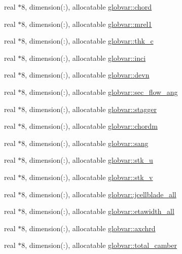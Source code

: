 \begin{DoxyCompactItemize}
real $\ast$8, dimension(\+:), allocatable \hyperlink{namespaceglobvar_a7b5f7850dbc4bf45b1c0477fe23101fd}{globvar\+::chord}
\item 
real $\ast$8, dimension(\+:), allocatable \hyperlink{namespaceglobvar_a0678586794cf430f0626766f74f99789}{globvar\+::mrel1}
\item 
real $\ast$8, dimension(\+:), allocatable \hyperlink{namespaceglobvar_a82469b82bd578f446472dd30088714f0}{globvar\+::thk\+\_\+c}
\item 
real $\ast$8, dimension(\+:), allocatable \hyperlink{namespaceglobvar_aa012253fe6b7a8b294e3e65bad3c31e8}{globvar\+::inci}
\item 
real $\ast$8, dimension(\+:), allocatable \hyperlink{namespaceglobvar_abfd9d4eb33cd8633c8aad2c1d7678bb2}{globvar\+::devn}
\item 
real $\ast$8, dimension(\+:), allocatable \hyperlink{namespaceglobvar_a208ad9b136524be1d4393b67f071b5eb}{globvar\+::sec\+\_\+flow\+\_\+ang}
\item 
real $\ast$8, dimension(\+:), allocatable \hyperlink{namespaceglobvar_adf510f84d1bfa9c2e369c105376b1009}{globvar\+::stagger}
\item 
real $\ast$8, dimension(\+:), allocatable \hyperlink{namespaceglobvar_aea4b21a5810c0b0a15759b11536d0a7e}{globvar\+::chordm}
\item 
real $\ast$8, dimension(\+:), allocatable \hyperlink{namespaceglobvar_a3f70e26ad6e5208ef5da2f77d96a7e55}{globvar\+::sang}
\item 
real $\ast$8, dimension(\+:), allocatable \hyperlink{namespaceglobvar_afbf780b139c39ff8db75247ee75175f6}{globvar\+::stk\+\_\+u}
\item 
real $\ast$8, dimension(\+:), allocatable \hyperlink{namespaceglobvar_a9d8a1cb2fc5fe27167d0e136347140cd}{globvar\+::stk\+\_\+v}
\item 
real $\ast$8, dimension(\+:), allocatable \hyperlink{namespaceglobvar_adecbf51d76538b4b226fcaa88b8d2c10}{globvar\+::jcellblade\+\_\+all}
\item 
real $\ast$8, dimension(\+:), allocatable \hyperlink{namespaceglobvar_af0124c85b1f11468ffb36b627963bf6a}{globvar\+::etawidth\+\_\+all}
\item 
real $\ast$8, dimension(\+:), allocatable \hyperlink{namespaceglobvar_aca0371a5b6c784a105a1c64ced0e28f5}{globvar\+::axchrd}
\item 
real $\ast$8, dimension(\+:), allocatable \hyperlink{namespaceglobvar_a69a510c5294264ed214fd28b3eb2c837}{globvar\+::total\+\_\+camber}
\item 

\end{DoxyCompactItemize}
